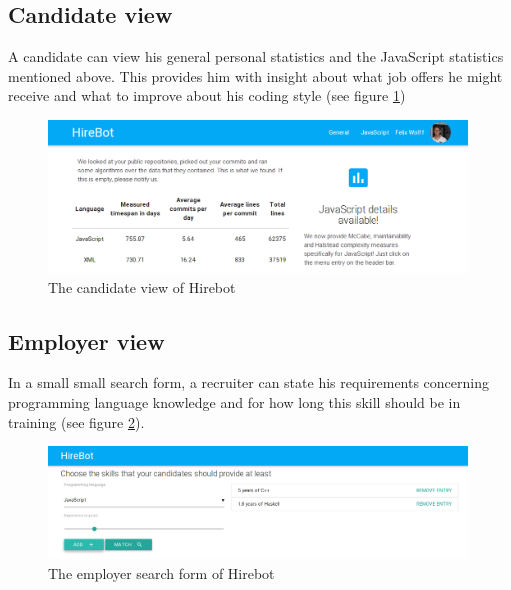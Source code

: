 \subsection{Candidate view}
A candidate can view his general personal statistics and the JavaScript statistics
mentioned above. This provides him with insight about what job offers he might
receive and what to improve about his coding style (see figure \ref{fig:candidateview})

\begin{figure}
  \includegraphics[width=30em]{gfx/candidateview.png}
  \caption{The candidate view of Hirebot}
  \label{fig:candidateview}
\end{figure}

\subsection{Employer view}
In a small small search form, a recruiter can state his requirements concerning
programming language knowledge and for how long this skill should be in training (see figure \ref{fig:employerview}).

\begin{figure}
  \includegraphics[width=30em]{gfx/employerview.png}
  \caption{The employer search form of Hirebot}
  \label{fig:employerview}
\end{figure}
